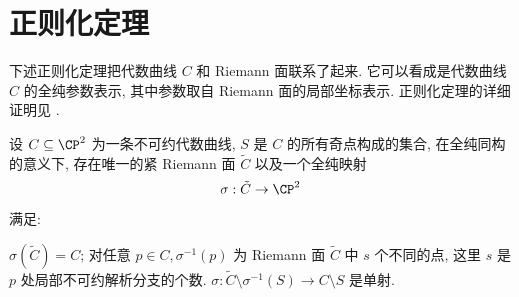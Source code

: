 \section{正则化定理}

下述正则化定理把代数曲线 $C$ 和 Riemann 面联系了起来.
它可以看成是代数曲线 $C$ 的全纯参数表示,
其中参数取自 Riemann 面的局部坐标表示.
正则化定理的详细证明见 \cite{textbook}.

\begin{thm}[正则化定理]
\label{thm:normalization}
设 $C \subseteq \CP^2$ 为一条不可约代数曲线,
$S$ 是 $C$ 的所有奇点构成的集合,
在全纯同构的意义下,
存在唯一的紧 Riemann 面 $\tilde{C}$ 以及一个全纯映射
\[\sigma: \tilde{C} \to \CP^2\]
满足:
\begin{enumerate}[label=\normalfont(\arabic*)]
    \ii $\sigma(\tilde{C}) = C$;
    \ii 对任意 $p \in C, \sigma^{-1}(p)$ 为 Riemann 面 $\tilde{C}$ 中 $s$ 个不同的点,
    这里 $s$ 是 $p$ 处局部不可约解析分支的个数.
    \ii $\sigma: \tilde{C}\setminus\sigma^{-1}(S) \to C\setminus S$ 是单射.
\end{enumerate}
\end{thm}

